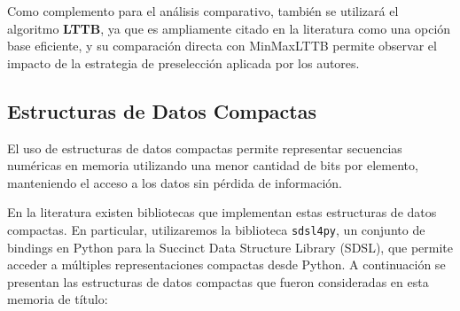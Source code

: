 Como complemento para el análisis comparativo, también se utilizará el algoritmo \textbf{LTTB}, ya que es ampliamente citado en la literatura como una opción base eficiente, y su comparación directa con MinMaxLTTB permite observar el impacto de la estrategia de preselección aplicada por los autores.

\subsection{Estructuras de Datos Compactas}

El uso de estructuras de datos compactas permite representar secuencias numéricas en memoria utilizando una menor cantidad de bits por elemento, manteniendo el acceso a los datos sin pérdida de información. 

En la literatura existen bibliotecas que implementan estas estructuras de datos compactas. En particular, utilizaremos la biblioteca \texttt{sdsl4py}, un conjunto de bindings en Python para la Succinct Data Structure Library (SDSL), que permite acceder a múltiples representaciones compactas desde  Python. A continuación se presentan las  estructuras de datos compactas que fueron consideradas en esta memoria de título:

